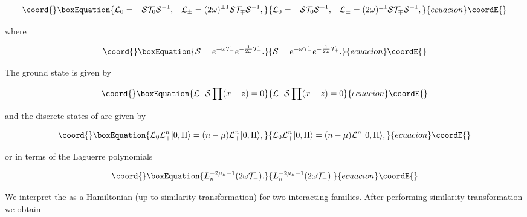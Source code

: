 \documentclass[a4paper,preprint,aps]{revtex4}
\begin{document}
\begin{equation}\coord{}\boxEquation{
	{\cal L}_{0}=-{\cal S}{\cal T}_{0}{\cal S}^{-1},\;\;\;
	{\cal L}_{\pm}=(2\omega)^{\pm 1}{\cal S}{\cal T}_{\mp}{\cal S}^{-1} ,
}{
	{\cal L}_{0}=-{\cal S}{\cal T}_{0}{\cal S}^{-1},\;\;\;
	{\cal L}_{\pm}=(2\omega)^{\pm 1}{\cal S}{\cal T}_{\mp}{\cal S}^{-1} ,
}{ecuacion}\coordE{}\end{equation}

where


\begin{equation}\coord{}\boxEquation{
	{\cal S}=e^{-\omega {\cal T}_{-}} e^{-\frac{1}{2\omega} {\cal T}_{+}} .
}{
	{\cal S}=e^{-\omega {\cal T}_{-}} e^{-\frac{1}{2\omega} {\cal T}_{+}} .
}{ecuacion}\coordE{}\end{equation}

The ground state is given by


\begin{equation}\coord{}\boxEquation{
	{\cal L}_{-} {\cal S} \prod (x-z)=0 
}{
	{\cal L}_{-} {\cal S} \prod (x-z)=0 
}{ecuacion}\coordE{}\end{equation}

and the discrete states of \coordHE{} are given by
 

\begin{equation}\coord{}\boxEquation{
	{\cal L}_{0} {\cal L}_{+}^{n} |0,\Pi \rangle =
 	(n-\mu) {\cal L}_{+}^{n} |0,\Pi \rangle ,
}{
	{\cal L}_{0} {\cal L}_{+}^{n} |0,\Pi \rangle =
 	(n-\mu) {\cal L}_{+}^{n} |0,\Pi \rangle ,
}{ecuacion}\coordE{}\end{equation}

or in terms of the Laguerre polynomials


\begin{equation}\coord{}\boxEquation{
	L_{n}^{-2\mu_{\kappa}-1}(2\omega{\cal T}_{-}) .
}{
	L_{n}^{-2\mu_{\kappa}-1}(2\omega{\cal T}_{-}) .
}{ecuacion}\coordE{}\end{equation}

We interpret the \coordHE{}
 as a Hamiltonian (up to similarity transformation) for two interacting
 families. After performing similarity transformation we obtain
\end{document}
